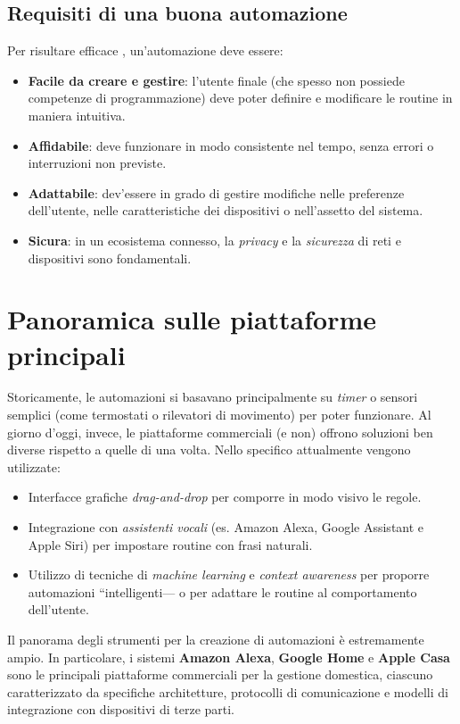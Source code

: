\subsection{Requisiti di una buona automazione}
Per risultare efficace \cite{Reisinger2023SmartHomeReq}, un'automazione deve essere:
\begin{itemize}
  \item \textbf{Facile da creare e gestire}: l'utente finale (che spesso non possiede competenze di programmazione) deve poter definire e modificare le routine in maniera intuitiva.
  \item \textbf{Affidabile}: deve funzionare in modo consistente nel tempo, senza errori o interruzioni non previste.
  \item \textbf{Adattabile}: dev'essere in grado di gestire modifiche nelle preferenze dell’utente, nelle caratteristiche dei dispositivi o nell’assetto del sistema.
  \item \textbf{Sicura}: in un ecosistema connesso, la \emph{privacy} e la \emph{sicurezza} di reti e dispositivi sono fondamentali.
\end{itemize}



\section{Panoramica sulle piattaforme principali}
Storicamente, le automazioni si basavano principalmente su \emph{timer} o sensori semplici (come termostati o rilevatori di movimento) per poter funzionare. 
Al giorno d'oggi, invece, le piattaforme commerciali (e non) offrono soluzioni ben diverse rispetto a quelle di una volta. 
Nello specifico attualmente vengono utilizzate:
\begin{itemize}
  \item Interfacce grafiche \emph{drag-and-drop} per comporre in modo visivo le regole.
  \item Integrazione con \emph{assistenti vocali} (es. Amazon Alexa, Google Assistant e Apple Siri) per impostare routine con frasi naturali.
  \item Utilizzo di tecniche di \emph{machine learning} e \emph{context awareness} per proporre automazioni “intelligenti— o per adattare le routine al comportamento dell’utente.
\end{itemize}

Il panorama degli strumenti per la creazione di automazioni è estremamente ampio. In particolare, i sistemi \textbf{Amazon Alexa}, \textbf{Google Home} e \textbf{Apple Casa} sono le principali piattaforme commerciali per la gestione domestica, ciascuno caratterizzato da specifiche architetture, protocolli di comunicazione e modelli di integrazione con dispositivi di terze parti.

